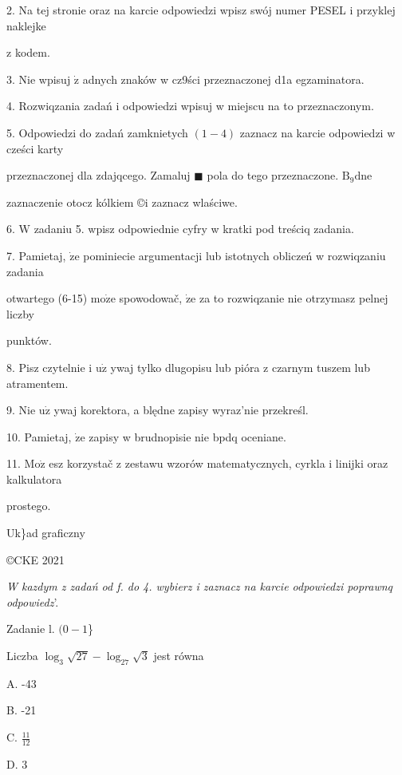 \documentclass[a4paper,12pt]{article}
\begin{document}
2. Na tej stronie oraz na karcie odpowiedzi wpisz swój numer PESEL i przyklej naklejke

z kodem.

3. Nie wpisuj $\dot{\mathrm{z}}$ adnych znaków w cz9ści przeznaczonej d1a egzaminatora.

4. Rozwiqzania zadań i odpowiedzi wpisuj w miejscu na to przeznaczonym.

5. Odpowiedzi do zadań zamknietych $(1-4)$ zaznacz na karcie odpowiedzi w cześci karty

przeznaczonej dla zdajqcego. Zamaluj $\blacksquare$ pola do tego przeznaczone. $\mathrm{B}_{9}\mathrm{d}\mathrm{n}\mathrm{e}$

zaznaczenie otocz kólkiem \copyright i zaznacz wlaściwe.

6. $\mathrm{W}$ zadaniu 5. wpisz odpowiednie cyfry w kratki pod treściq zadania.

7. Pamietaj, $\dot{\mathrm{z}}\mathrm{e}$ pominiecie argumentacji lub istotnych obliczeń w rozwiqzaniu zadania

otwartego (6-15) $\mathrm{m}\mathrm{o}\dot{\mathrm{z}}\mathrm{e}$ spowodowač, $\dot{\mathrm{z}}\mathrm{e}$ za to rozwiqzanie nie otrzymasz pelnej liczby

punktów.

8. Pisz czytelnie i $\mathrm{u}\dot{\mathrm{z}}$ ywaj tylko dlugopisu lub pióra z czarnym tuszem lub atramentem.

9. Nie $\mathrm{u}\dot{\mathrm{z}}$ ywaj korektora, a blędne zapisy wyraz'nie przekreśl.

10. Pamietaj, $\dot{\mathrm{z}}\mathrm{e}$ zapisy w brudnopisie nie bpdq oceniane.

11. $\mathrm{M}\mathrm{o}\dot{\mathrm{z}}$ esz korzystač z zestawu wzorów matematycznych, cyrkla i linijki oraz kalkulatora

prostego.

Uk\}ad graficzny

\copyright CKE 2021




{\it W kazdym z zadań od f. do 4. wybierz i zaznacz na karcie odpowiedzi poprawnq odpowiedz}'.

Zadanie l. $(0-1$\}

Liczba $\log_{3}\sqrt{27}-\log_{27}\sqrt{3}$ jest równa

A. -43

B. -21

C. $\displaystyle \frac{11}{12}$

D. 3
\end{document}
